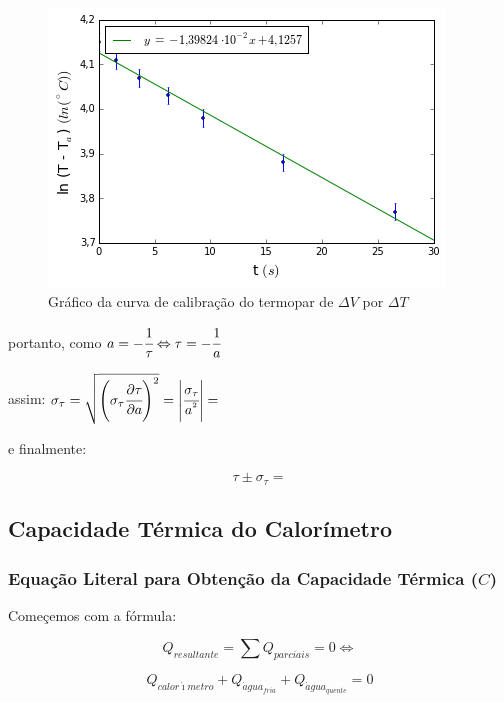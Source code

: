 \documentclass[a4paper]{article}
\begin{document}
	    
	    	\begin{figure}[!ht]
	    		\begin{centering}
	    		\includegraphics[scale=0.745]{exp06a-parte2} 
	    	\par\end{centering}
	    
	    	\protect\caption{Gráfico da curva de calibração do termopar de $\Delta V$ por $\Delta T$}
	    	\end{figure}
	    
	    
	    	portanto, como $a=-\cfrac{1}{\tau}\Leftrightarrow\tau=-\cfrac{1}{a}$
	    
	    	assim: $\sigma_{\tau}=\sqrt{\left(\sigma_{\tau}\cfrac{\partial\tau}{\partial a}\right)^{2}}=\left|\cfrac{\sigma_{\tau}}{a^{^{2}}}\right|=$
	    
	    	e finalmente:
	    
	    	\begin{equation}
	    		\tau\pm\sigma_{\tau}=
	    	\end{equation}


	\subsection{Capacidade Térmica do Calorímetro}


		\subsubsection{Equação Literal para Obtenção da Capacidade Térmica ($C$)}

			Começemos com a fórmula:

			$$Q_{resultante}={\displaystyle \sum Q_{parciais}=0}\Leftrightarrow$$


			\begin{equation}
				Q_{calor\acute{\imath}metro}+Q_{\acute{a}gua_{fria}}+Q_{\acute{a}gua_{quente}}=0
			\end{equation}
\end{document}
